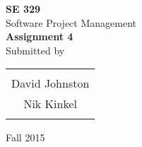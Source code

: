 \begin{titlepage}

\begin{center}

\textup{\small {\bf SE 329} \\ Software Project Management}\\[0.2in]

\Huge \textbf {Assignment 4}\\[0.5in]

\normalsize Submitted by \\
\begin{table}[h]
\centering
\begin{tabular}{c}\hline \\
David Johnston \\
Nik Kinkel\\
\\ \hline
\end{tabular}
\end{table}

\vfill

\vspace{0.2cm}
Fall 2015

\end{center}
\end{titlepage}
